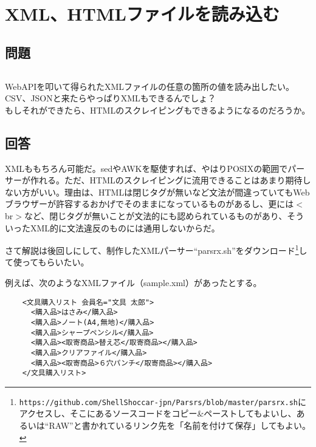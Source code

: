 \section{XML、HTMLファイルを読み込む}
\label{recipe:XML_parser}

\subsection*{問題}
\noindent
$\!\!\!\!\!$
\begin{grshfboxit}{160.0mm}
	WebAPIを叩いて得られたXMLファイルの任意の箇所の値を読み出したい。CSV、JSONと来たらやっぱりXMLもできるんでしょ？\\
	もしそれができたら、HTMLのスクレイピングもできるようになるのだろうか。
\end{grshfboxit}

\subsection*{回答}
XMLももちろん可能だ。sedやAWKを駆使すれば、やはりPOSIXの範囲でパーサーが作れる。ただ、HTMLのスクレイピングに流用できることはあまり期待しない方がいい。理由は、HTMLは閉じタグが無いなど文法が間違っていてもWebブラウザーが許容するおかげでそのままになっているものがあるし、更には$<$br$>$など、閉じタグが無いことが文法的にも認められているものがあり、そういったXML的に文法違反のものには通用しないからだ。

さて解説は後回しにして、制作したXMLパーサー``parsrx.sh''をダウンロード\footnote{\verb|https://github.com/ShellShoccar-jpn/Parsrs/blob/master/parsrx.sh|にアクセスし、そこにあるソースコードをコピー\&{}ペーストしてもよいし、あるいは``RAW''と書かれているリンク先を「名前を付けて保存」してもよい。}して使ってもらいたい。

例えば、次のようなXMLファイル（sample.xml）があったとする。\\
\begin{frameboxit}{160.0mm}
\begin{verbatim}
	<文具購入リスト 会員名="文具 太郎">
	  <購入品>はさみ</購入品>
	  <購入品>ノート(A4,無地)</購入品>
	  <購入品>シャープペンシル</購入品>
	  <購入品><取寄商品>替え芯</取寄商品></購入品>
	  <購入品>クリアファイル</購入品>
	  <購入品><取寄商品>６穴パンチ</取寄商品></購入品>
	</文具購入リスト>
\end{verbatim}
\end{frameboxit}

